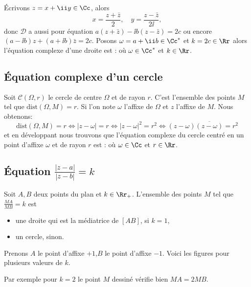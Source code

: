 \documentclass[class=report,crop=false]{standalone}
\begin{document}
\'Ecrivons $z=x+\ii  y \in \Cc$, alors
$$x = \frac{z+\bar z}{2}, \quad y = \frac{z - \bar z}{2 \ii },$$
donc $\mathcal{D}$ a aussi pour équation
$a(z+\bar z) -\ii  b(z-\bar z)=2c$ ou encore $(a-\ii  b)z+(a+\ii  b)\bar z = 2c$.
Posons $\omega = a+\ii  b \in \Cc^*$ et $k=2c \in \Rr$ alors
l'équation complexe d'une droite est :
où $\omega \in \Cc^*$ et $k\in \Rr$.


\subsection{\'Equation complexe d'un cercle}

Soit $\mathcal{C}(\Omega,r)$ le cercle de centre $\Omega$ et de rayon $r$.
C'est l'ensemble des points $M$ tel que $\mathrm{dist}(\Omega,M)=r$. Si l'on note $\omega$ l'affixe
de $\Omega$ et $z$ l'affixe de $M$. Nous obtenons:
$$\mathrm{dist}(\Omega,M) = r \iff  |z-\omega|=r \iff |z-\omega|^2=r^2 \iff (z-\omega)\overline{(z-\omega)}=r^2$$
et en développant nous trouvons que l'équation complexe du cercle centré en un point d'affixe $\omega$
et de rayon $r$ est :
où  $\omega \in \Cc$ et $r\in \Rr$.


\subsection{\'Equation $\frac{|z-a|}{|z-b|}=k$}

\begin{proposition}
Soit $A,B$ deux points du plan et $k\in \Rr_+$.
L'ensemble des points $M$ tel que $\frac{MA}{MB}=k$
est
\begin{itemize}
  \item une droite qui est la médiatrice de $[AB]$, si $k=1$,
  \item un cercle, sinon.
\end{itemize}
\end{proposition}

\begin{exemple}
Prenons $A$ le point d'affixe $+1$,$B$ le point d'affixe $-1$.
Voici les figures pour plusieurs valeurs de $k$.

Par exemple pour $k=2$ le point $M$ dessiné vérifie bien $MA=2MB$.

\end{exemple}
\end{document}
